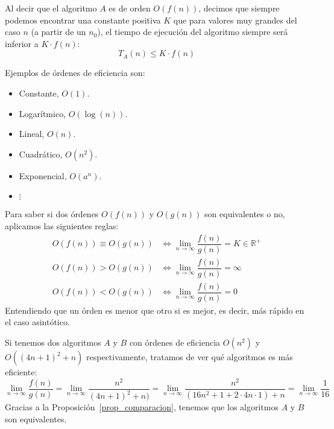 Al decir que el algoritmo $A$ es de orden $O(f(n))$, decimos que siempre podemos encontrar una constante positiva $K$ que para valores muy grandes del caso $n$ (a partir de un $n_0$), el tiempo de ejecución del algoritmo siempre será inferior a $K \cdot f(n)$:
\begin{equation*}
T_A(n) \leq K \cdot f(n)
\end{equation*}

Ejemplos de órdenes de eficiencia son:
\begin{itemize}
    \item Constante, $O(1)$.
    \item Logarítmico, $O(\log(n))$.
    \item Lineal, $O(n)$.
    \item Cuadrático, $O(n^2)$.
    \item Exponencial, $O(a^n)$.
    \item $\vdots$
\end{itemize}

\begin{prop}\label{prop_comparacion}
Para saber si dos órdenes $O(f(n))$ y $O(g(n))$ son equivalentes o no, aplicamos las siguientes reglas:
\begin{align*}
O(f(n)) \equiv O(g(n)) &\Longleftrightarrow \lim_{n \to \infty} \dfrac{f(n)}{g(n)} = K \in \mathbb{R}^{+}\\
O(f(n)) > O(g(n)) &\Longleftrightarrow \lim_{n \to \infty} \dfrac{f(n)}{g(n)} = \infty\\
O(f(n)) < O(g(n)) &\Longleftrightarrow \lim_{n \to \infty} \dfrac{f(n)}{g(n)} = 0
\end{align*}
Entendiendo que un órden es menor que otro si es mejor, es decir, más rápido en el caso asintótico.
\end{prop}

\begin{ejemplo}
Si tenemos dos algoritmos $A$ y $B$ con órdenes de eficiencia $O(n^2)$ y $O((4n+1)^2+n)$ respectivamente, tratamos de ver qué algoritmos es más eficiente:
\begin{equation*}
\lim_{n\to \infty} \dfrac{f(n)}{g(n)} = \lim_{n\to\infty}\dfrac{n^2}{(4n+1)^2+n)} = \lim_{n\to\infty}\dfrac{n^2}{(16n^2 +1+2\cdot 4n\cdot 1)+n} = \lim_{n\to\infty}\dfrac{1}{16}
\end{equation*}
Gracias a la Proposición~\ref{prop_comparacion}, tenemos que los algoritmos $A$ y $B$ son equivalentes.
\end{ejemplo}

